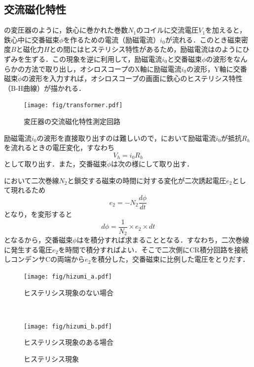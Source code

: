 \subsection{交流磁化特性}
\label{zika}
の変圧器のように，鉄心に巻かれた巻数$N_1$のコイルに交流電圧$V_1$を加えると，鉄心中に交番磁束$\dot{\phi}$を作るための電流（励磁電流）$i_0$が流れる．このとき磁束密度$B$と磁化力$H$との間にはヒステリシス特性があるため，励磁電流はのようにひずみを生ずる．この現象を逆に利用して，励磁電流$i_0$と交番磁束$\dot{\phi}$の波形をなんらかの方法で取り出し，オシロスコープのX軸に励磁電流$i_0$の波形，Y軸に交番磁束$\dot{\phi}$の波形を入力すれば，オシロスコープの画面に鉄心のヒステリシス特性（B-H曲線）が描かれる．
\begin{figure}[htbp]
	\centering
	\texttt{[image: fig/transformer.pdf]}
	\caption{変圧器の交流磁化特性測定回路}
	\label{fig:hys:transformer}
\end{figure}

励磁電流$i_0$の波形を直接取り出すのは難しいので，において励磁電流$i_0$が抵抗$R_h$を流れるときの電圧変化，すなわち
\begin{equation}
	V_h = i_0R_h
\end{equation}
として取り出す．また，交番磁束$\dot{\phi}$は次の様にして取り出す．

において二次巻線$N_2$と鎖交する磁束の時間に対する変化が二次誘起電圧$e_2$として現れるため
\begin{equation}
	e_2 = -N_2\frac{d \phi}{dt}
	\label{eq:hys:e2}
\end{equation}
となり，を変形すると
\begin{equation}
	d \phi = \frac{1}{N_2}\times e_2\times dt
	\label{eq:hys:dphi}
\end{equation}
となるから，交番磁束$\phi$はを積分すれば求まることとなる．すなわち，二次巻線に発生する電圧$e_2$を時間で積分すればよい．そこで二次側にCR積分回路を接続しコンデンサCの両端から$e_2$を積分した，交番磁束に比例した電圧をとりだす．

\begin{figure}[h]
  \begin{minipage}[c]{0.5\hsize}
    \centering
    \texttt{[image: fig/hizumi\_a.pdf]} 
    \caption{ヒステリシス現象のない場合}
  \end{minipage}\\
  \begin{minipage}[c]{0.5\hsize}
    \centering
    \texttt{[image: fig/hizumi\_b.pdf]}
    \caption{ヒステリシス現象のある場合}
  \end{minipage}
  \centering
  \caption{ヒステリシス現象}
   \label{fig:hys:hizumi}
\end{figure}

